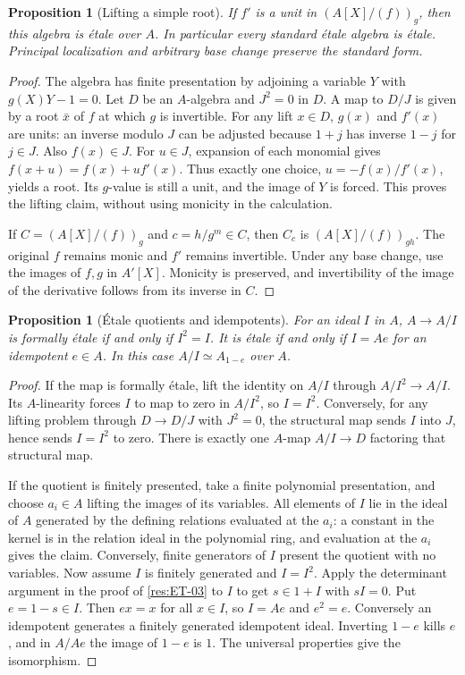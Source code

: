 \documentclass[11pt,oneside,openany]{book}
\newtheorem{proposition}[theorem]{Proposition}
\theoremstyle{definition}
\theoremstyle{remark}
\begin{document}
\begin{proposition}[Lifting a simple root]\label{res:ET-07}
If $f'$ is a unit in $(A[X]/(f))_g$, then this algebra is
\'etale over $A$. In particular every standard \'{e}tale algebra
is \'{e}tale. Principal localization and arbitrary base change
preserve the standard form.
\end{proposition}
\begin{proof}
The algebra has finite presentation by adjoining a variable $Y$
with $g(X)Y-1=0$. Let $D$ be an $A$-algebra and $J^2=0$ in $D$.
A map to $D/J$ is given by a root $\bar x$ of $f$ at which
$g$ is invertible. For any lift $x\in D$, $g(x)$ and $f'(x)$ are units:
an inverse modulo $J$ can be adjusted because $1+j$ has inverse $1-j$
for $j\in J$. Also $f(x)\in J$. For $u\in J$, expansion of each
monomial gives $f(x+u)=f(x)+u f'(x)$. Thus exactly one choice,
$u=-f(x)/f'(x)$, yields a root. Its $g$-value is still a unit,
and the image of $Y$ is forced. This proves the lifting claim,
without using monicity in the calculation.

If $C=(A[X]/(f))_g$ and $c=h/g^m\in C$, then $C_c$ is
$(A[X]/(f))_{gh}$. The original $f$ remains monic and $f'$
remains invertible.
Under any base change, use the images of $f,g$ in $A'[X]$.
Monicity is preserved, and invertibility of the image of the
derivative follows from its inverse in $C$.
\end{proof}

\begin{proposition}[\'Etale quotients and idempotents]\label{res:ET-08}
For an ideal $I$ in $A$, $A\to A/I$ is formally \'{e}tale if and
only if $I^2=I$. It is \'{e}tale if and only if $I=Ae$ for an
idempotent $e\in A$. In this case $A/I\simeq A_{1-e}$ over $A$.
\end{proposition}
\begin{proof}
If the map is formally \'{e}tale, lift the identity on $A/I$
through $A/I^2\to A/I$. Its $A$-linearity forces $I$ to map to
zero in $A/I^2$, so $I=I^2$. Conversely, for any lifting problem
through $D\to D/J$ with $J^2=0$, the structural map sends $I$
into $J$, hence sends $I=I^2$ to zero. There is exactly one
$A$-map $A/I\to D$ factoring that structural map.

If the quotient is finitely presented, take a finite polynomial
presentation, and choose $a_i\in A$ lifting the images of its
variables. All elements of $I$ lie in the ideal of $A$ generated by
the defining relations evaluated at the $a_i$: a constant in the
kernel is in the relation ideal in the polynomial ring, and evaluation
at the $a_i$ gives the claim. Conversely, finite generators of $I$
present the quotient with no variables. Now assume $I$ is finitely
generated and $I=I^2$. Apply the determinant argument in the proof
of \ref{res:ET-03} to $I$ to get $s\in1+I$ with $sI=0$.
Put $e=1-s\in I$. Then $ex=x$ for all $x\in I$, so $I=Ae$
and $e^2=e$. Conversely an idempotent generates a finitely generated
idempotent ideal. Inverting $1-e$ kills $e$, and in $A/Ae$ the
image of $1-e$ is $1$. The universal properties give the isomorphism.
\end{proof}
\end{document}
